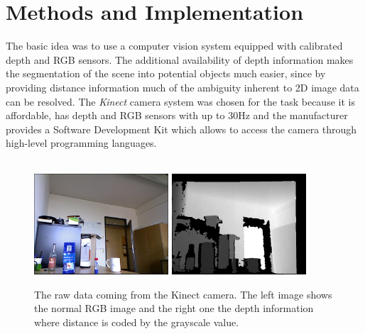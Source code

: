 \chapter{Methods and Implementation} %

The basic idea was to use a computer vision system equipped with calibrated depth and RGB sensors. The additional availability of depth information makes the segmentation of the scene into potential objects much easier, since by providing distance information much of the ambiguity inherent to 2D image data can be resolved. The \emph{Kinect} camera system was chosen for the task because it is affordable, has depth and RGB sensors with up to 30Hz and the manufacturer provides a Software Development Kit which allows to access the camera through high-level programming languages.\\ \\
\begin{figure}[ht]
    \centering
        \includegraphics[width=5cm]{images/image.jpg}
        \hspace{0.1cm}
        \includegraphics[width=5cm]{images/depth.jpg}
    \caption{The raw data coming from the Kinect camera. The left image shows the normal RGB image and the right one the depth information where distance is coded by the grayscale value.}
    \label{sg:fig:masked_patches}
\end{figure}

